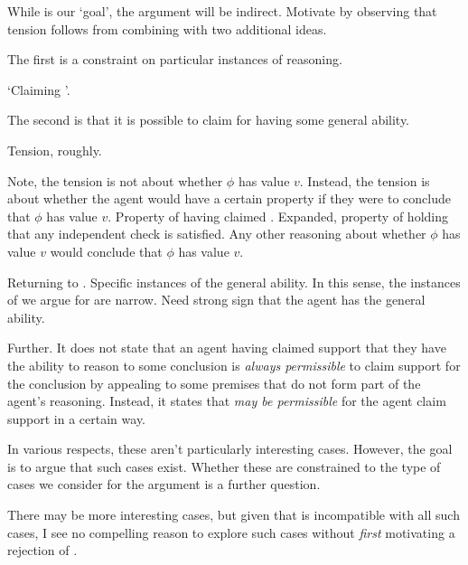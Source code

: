 \begin{note}
  While \EAS{} is our `goal', the argument will be indirect.
  Motivate \EAS{} by observing that tension follows from combining \USE{} with two additional ideas.
\end{note}

\begin{note}
  The first is a constraint on particular instances of reasoning.

  `Claiming \support{}'.
\end{note}

\begin{note}
  The second is that it is possible to claim \support{} for having some general ability.
\end{note}

\begin{note}
  Tension, roughly.
\end{note}

\begin{note}
  Note, the tension is not about whether \(\phi\) has value \(v\).
  Instead, the tension is about whether the agent would have a certain property if they were to conclude that \(\phi\) has value \(v\).
  Property of having claimed \support{}.
  Expanded, property of holding that any independent check is satisfied.
  Any other reasoning about whether \(\phi\) has value \(v\) would conclude that \(\phi\) has value \(v\).
\end{note}

\begin{note}
  Returning to \EAS{}.
  Specific instances of the general ability.
  In this sense, the instances of \EAS{} we argue for are narrow.
  Need strong sign that the agent has the general ability.

  Further.
  It does not state that an agent having claimed support that they have the ability to reason to some conclusion is \emph{always permissible} to claim support for the conclusion by appealing to some premises that do not form part of the agent's reasoning.
  Instead, it states that \emph{may be permissible} for the agent claim support in a certain way.

  In various respects, these aren't particularly interesting cases.
  However, the goal is to argue that such cases exist.
  Whether these are constrained to the type of cases we consider for the argument is a further question.

  There may be more interesting cases, but given that \ESU{} is incompatible with all such cases, I see no compelling reason to explore such cases without \emph{first} motivating a rejection of \ESU{}.
\end{note}



